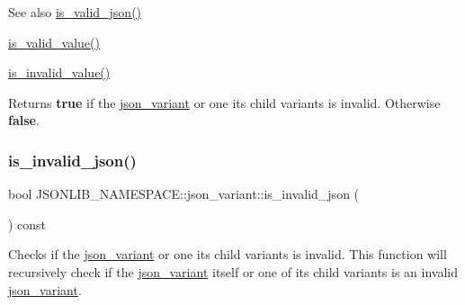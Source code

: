 \begin{DoxySeeAlso}{See also}
\hyperlink{classJSONLIB__NAMESPACE_1_1json__variant_a158e3148d9256af3d1b8251b2ca7b6c4}{is\+\_\+valid\+\_\+json()} 

\hyperlink{classJSONLIB__NAMESPACE_1_1json__variant_a224aab2dd56e3928dd893be8b7f3367a}{is\+\_\+valid\+\_\+value()} 

\hyperlink{classJSONLIB__NAMESPACE_1_1json__variant_ab6552a5e3de90ab1fbca078e5c245bfb}{is\+\_\+invalid\+\_\+value()} 
\end{DoxySeeAlso}
\begin{DoxyReturn}{Returns}
{\bfseries true} if the \hyperlink{classJSONLIB__NAMESPACE_1_1json__variant}{json\+\_\+variant} or one it\textquotesingle{}s child variants is invalid. Otherwise {\bfseries false}. 
\end{DoxyReturn}
\mbox{\label{classJSONLIB__NAMESPACE_1_1json__variant_a1a08b35da4cf3a334d32ebb81b20c08a}} 
\subsubsection{\texorpdfstring{is\+\_\+invalid\+\_\+json()}{is\_invalid\_json()}\hspace{0.1cm}{\footnotesize\ttfamily [2/2]}}
{\footnotesize\ttfamily bool J\+S\+O\+N\+L\+I\+B\+\_\+\+N\+A\+M\+E\+S\+P\+A\+C\+E\+::json\+\_\+variant\+::is\+\_\+invalid\+\_\+json (\begin{DoxyParamCaption}{ }\end{DoxyParamCaption}) const}



Checks if the \hyperlink{classJSONLIB__NAMESPACE_1_1json__variant}{json\+\_\+variant} or one its child variants is invalid. This function will recursively check if the \hyperlink{classJSONLIB__NAMESPACE_1_1json__variant}{json\+\_\+variant} itself or one of its child variants is an invalid \hyperlink{classJSONLIB__NAMESPACE_1_1json__variant}{json\+\_\+variant}. 

